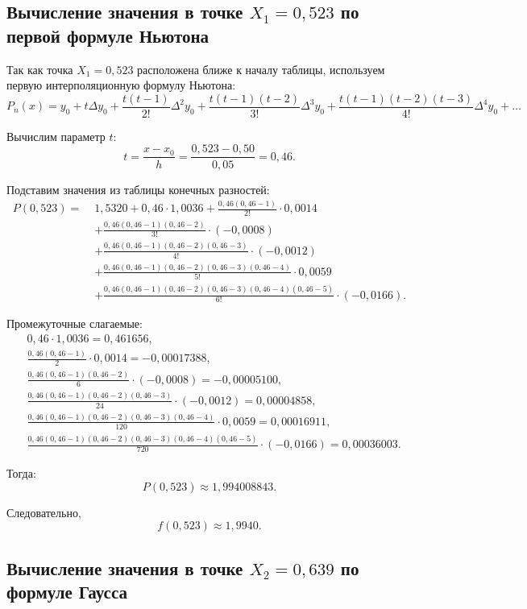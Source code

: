 \documentclass[12pt]{report}
\begin{document}
	\subsection*{Вычисление значения в точке \(X_1 = 0{,}523\) по первой формуле Ньютона}
	
	Так как точка \(X_1 = 0{,}523\) расположена ближе к началу таблицы, используем первую интерполяционную формулу Ньютона:
	\[
	P_n(x) = y_0 + t \Delta y_0 + \frac{t(t-1)}{2!}\Delta^2 y_0
	+ \frac{t(t-1)(t-2)}{3!}\Delta^3 y_0
	+ \frac{t(t-1)(t-2)(t-3)}{4!}\Delta^4 y_0 + \dots
	\]
	
	Вычислим параметр \(t\):
	\[
	t = \frac{x - x_0}{h} = \frac{0{,}523 - 0{,}50}{0{,}05} = 0{,}46.
	\]
	
	Подставим значения из таблицы конечных разностей:
	\[
	\begin{aligned}
		P(0{,}523) =\;& 1{,}5320
		+ 0{,}46 \cdot 1{,}0036
		+ \frac{0{,}46(0{,}46-1)}{2!}\cdot 0{,}0014 \\
		&+ \frac{0{,}46(0{,}46-1)(0{,}46-2)}{3!}\cdot (-0{,}0008) \\
		&+ \frac{0{,}46(0{,}46-1)(0{,}46-2)(0{,}46-3)}{4!}\cdot (-0{,}0012) \\
		&+ \frac{0{,}46(0{,}46-1)(0{,}46-2)(0{,}46-3)(0{,}46-4)}{5!}\cdot 0{,}0059 \\
		&+ \frac{0{,}46(0{,}46-1)(0{,}46-2)(0{,}46-3)(0{,}46-4)(0{,}46-5)}{6!}\cdot (-0{,}0166).
	\end{aligned}
	\]
	
	Промежуточные слагаемые:
	\[
	\begin{aligned}
		&0{,}46 \cdot 1{,}0036 = 0{,}461656,\\
		&\frac{0{,}46(0{,}46-1)}{2}\cdot 0{,}0014 = -0{,}00017388,\\
		&\frac{0{,}46(0{,}46-1)(0{,}46-2)}{6}\cdot (-0{,}0008) = -0{,}00005100,\\
		&\frac{0{,}46(0{,}46-1)(0{,}46-2)(0{,}46-3)}{24}\cdot (-0{,}0012) = 0{,}00004858,\\
		&\frac{0{,}46(0{,}46-1)(0{,}46-2)(0{,}46-3)(0{,}46-4)}{120}\cdot 0{,}0059 = 0{,}00016911,\\
		&\frac{0{,}46(0{,}46-1)(0{,}46-2)(0{,}46-3)(0{,}46-4)(0{,}46-5)}{720}\cdot (-0{,}0166) = 0{,}00036003.
	\end{aligned}
	\]
	
	Тогда:
	\[
	P(0{,}523) \approx 1{,}994008843.
	\]
	
	Следовательно,
	\[
	\boxed{f(0{,}523) \approx 1{,}9940.}
	\]
	
	\subsection*{Вычисление значения в точке \(X_2 = 0{,}639\) по формуле Гаусса}
	
\end{document}
